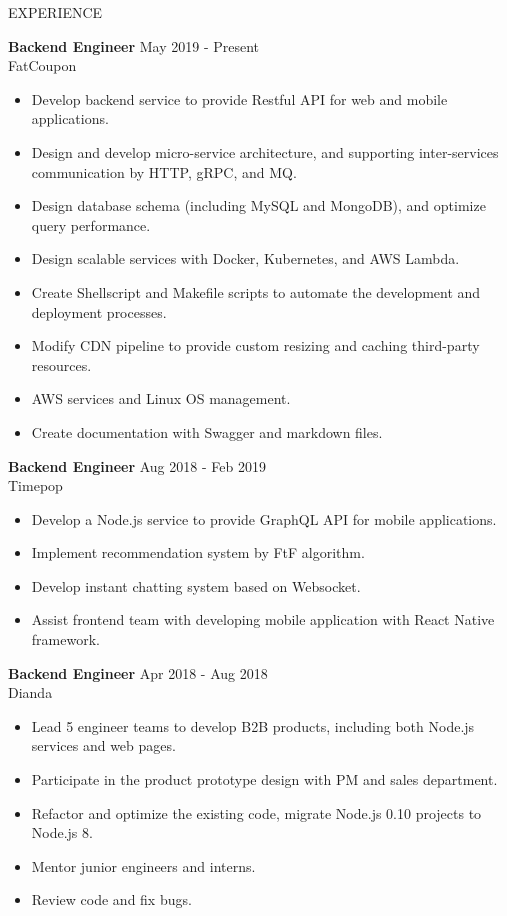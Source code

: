 \documentclass{resume} %
\begin{document}
\begin{rSection}{EXPERIENCE}

\textbf{Backend Engineer} \hfill May 2019 - Present\\
FatCoupon \hfill \textit{}
\begin{itemize}
  \itemsep -3pt {}
  \item Develop backend service to provide Restful API for web and mobile applications.
  \item Design and develop micro-service architecture, and supporting inter-services communication by HTTP, gRPC, and MQ.
  \item Design database schema (including MySQL and MongoDB), and optimize query performance.
  \item Design scalable services with Docker, Kubernetes, and AWS Lambda.
  \item Create Shellscript and Makefile scripts to automate the development and deployment processes.
  \item Modify CDN pipeline to provide custom resizing and caching third-party resources.
  \item AWS services and Linux OS management.
  \item Create documentation with Swagger and markdown files.
\end{itemize}

\textbf{Backend Engineer} \hfill Aug 2018 - Feb 2019\\
Timepop \hfill \textit{}
\begin{itemize}
  \itemsep -3pt {}
  \item Develop a Node.js service to provide GraphQL API for mobile applications.
  \item Implement recommendation system by FtF algorithm.
  \item Develop instant chatting system based on Websocket.
  \item Assist frontend team with developing mobile application with React Native framework.
\end{itemize}

\textbf{Backend Engineer} \hfill Apr 2018 - Aug 2018\\
Dianda \hfill \textit{}
\begin{itemize}
  \itemsep -3pt {}
  \item Lead 5 engineer teams to develop B2B products, including both Node.js services and web pages.
  \item Participate in the product prototype design with PM and sales department.
  \item Refactor and optimize the existing code, migrate Node.js 0.10 projects to Node.js 8.
  \item Mentor junior engineers and interns.
  \item Review code and fix bugs.
\end{itemize}


\end{rSection}
\end{document}
